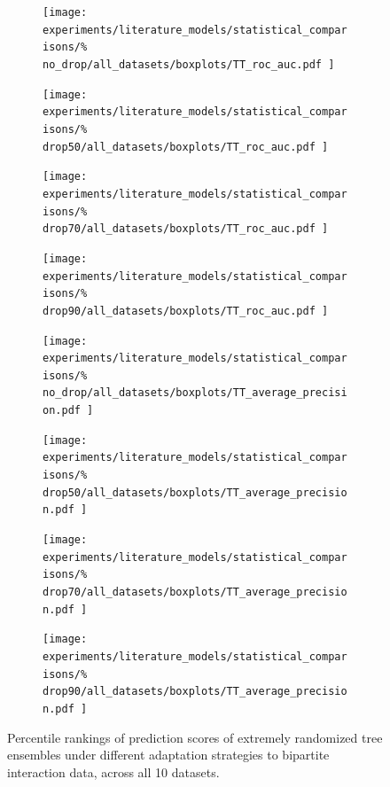 \begin{figure}[tb]
    \begin{subfigure}{0.24\textwidth}
        \texttt{[image: 
            experiments/literature\_models/statistical\_comparisons/\%
            no\_drop/all\_datasets/boxplots/TT\_roc\_auc.pdf
        ]}
    \end{subfigure}
    \begin{subfigure}{0.24\textwidth}
        \texttt{[image: 
            experiments/literature\_models/statistical\_comparisons/\%
            drop50/all\_datasets/boxplots/TT\_roc\_auc.pdf
        ]}
    \end{subfigure}
    \begin{subfigure}{0.24\textwidth}
        \texttt{[image: 
            experiments/literature\_models/statistical\_comparisons/\%
            drop70/all\_datasets/boxplots/TT\_roc\_auc.pdf
        ]}
    \end{subfigure}
    \begin{subfigure}{0.24\textwidth}
        \texttt{[image: 
            experiments/literature\_models/statistical\_comparisons/\%
            drop90/all\_datasets/boxplots/TT\_roc\_auc.pdf
        ]}
    \end{subfigure}

    \begin{subfigure}{0.24\textwidth}
        \texttt{[image: 
            experiments/literature\_models/statistical\_comparisons/\%
            no\_drop/all\_datasets/boxplots/TT\_average\_precision.pdf
        ]}
    \end{subfigure}
    \begin{subfigure}{0.24\textwidth}
        \texttt{[image: 
            experiments/literature\_models/statistical\_comparisons/\%
            drop50/all\_datasets/boxplots/TT\_average\_precision.pdf
        ]}
    \end{subfigure}
    \begin{subfigure}{0.24\textwidth}
        \texttt{[image: 
            experiments/literature\_models/statistical\_comparisons/\%
            drop70/all\_datasets/boxplots/TT\_average\_precision.pdf
        ]}
    \end{subfigure}
    \begin{subfigure}{0.24\textwidth}
        \texttt{[image: 
            experiments/literature\_models/statistical\_comparisons/\%
            drop90/all\_datasets/boxplots/TT\_average\_precision.pdf
        ]}
    \end{subfigure}
    \caption{
        Percentile rankings of prediction scores of extremely randomized tree ensembles under different adaptation strategies to bipartite interaction data, across all 10 datasets.
    }
    \label{fig:comparison literature}
\end{figure}


